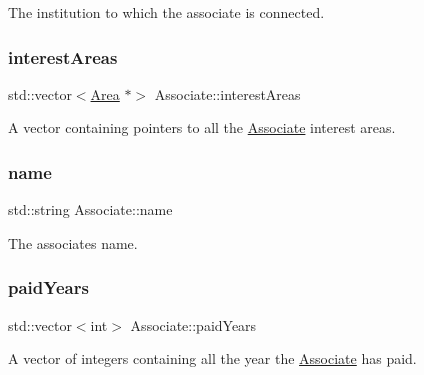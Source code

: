 The institution to which the associate is connected. 

\mbox{\label{classAssociate_aa4083f0fff7ce7d580f7e2df8f9dbaf2}} 
\subsubsection{\texorpdfstring{interest\+Areas}{interestAreas}}
{\footnotesize\ttfamily std\+::vector$<$\hyperlink{classArea}{Area} $\ast$$>$ Associate\+::interest\+Areas\hspace{0.3cm}{\ttfamily [private]}}



A vector containing pointers to all the \hyperlink{classAssociate}{Associate} interest areas. 

\mbox{\label{classAssociate_ad52875abacf1836cd879b7dffb88d589}} 
\subsubsection{\texorpdfstring{name}{name}}
{\footnotesize\ttfamily std\+::string Associate\+::name\hspace{0.3cm}{\ttfamily [private]}}



The associate\textquotesingle{}s name. 

\mbox{\label{classAssociate_ad7d373d77a5c49eb845e89729962c30d}} 
\subsubsection{\texorpdfstring{paid\+Years}{paidYears}}
{\footnotesize\ttfamily std\+::vector$<$int$>$ Associate\+::paid\+Years\hspace{0.3cm}{\ttfamily [private]}}



A vector of integers containing all the year the \hyperlink{classAssociate}{Associate} has paid. 

\mbox{\label{classAssociate_adc7e2decb409cd226e1508c1c5df3b90}} 
